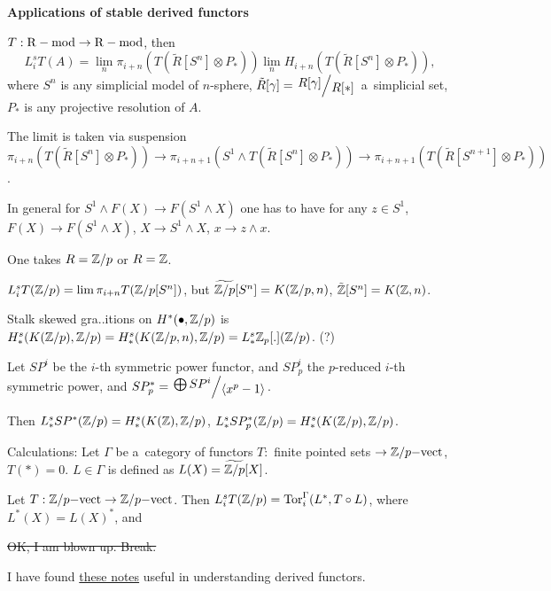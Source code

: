 



    {\bf Applications of stable derived functors}
    
    \begin{theorem}
        $T:\mathrm{R-mod} \to \mathrm{R-mod}$, then 
        $$L_i^sT(A) = \lim_n \pi_{i+n}(T(\tilde{R}[S^n] \otimes P_\ast))
        \lim_n H_{i+n}(T(\tilde{R}[S^n] \otimes P_\ast)),$$
        where $S^n$ is any simplicial model of $n$-sphere,
        $\tilde{R}[\gamma] = \bigslant{R[\gamma]}{R[\ast]}$ a~simplicial set,
        $P_\ast$ is any projective resolution of $A$.
        
        The limit is taken via suspension
        \\ $\pi_{i+n}(T(\tilde{R}[S^n] \otimes P_\ast)) 
        \to \pi_{i+n+1}(S^1 \wedge T(\tilde{R}[S^n] \otimes P_\ast))
        \to \pi_{i+n+1}(T(\tilde{R}[S^{n+1}] \otimes P_\ast))$.
    \end{theorem}
        
    In general for $S^1 \wedge F(X) \to F(S^1 \wedge X)$
    one has to have for any $z \in S^1$,
    ${F(X) \to F(S^1 \wedge X)}$, $X \to S^1 \wedge X$, $x \to z \wedge x$.
    
    One takes $R = {\mathbb{Z}} / p$ or $R = {\mathbb{Z}}$.
    
    $L_i^sT({\mathbb{Z}}/p) = \lim \pi_{i+n} T({\mathbb{Z}}/p [S^n])$,
    but $\widetilde{{\mathbb{Z}}/p}[S^n] = K({\mathbb{Z}}/p,n)$,
    $\tilde{{\mathbb{Z}}}[S^n] = K({\mathbb{Z}}, n)$.
    
    Stalk skewed gra..itions on $H^\ast(\bullet, {\mathbb{Z}}/p)$
    is \\$H_\ast^s(K({\mathbb{Z}}/p),{\mathbb{Z}}/p) 
    = H_\ast^s(K({\mathbb{Z}}/p,n),{\mathbb{Z}}/p)
    = L_\ast^s {\mathbb{Z}}_p[.]({\mathbb{Z}}/p)$. (?)
    
    \begin{theorem}
        Let $SP^i$ be the $i$-th symmetric power functor,
        and $SP^i_p$ the $p$-reduced $i$-th symmetric power,
        and $SP^\ast_p = \bigslant{\bigoplus SP^i}{\langle x^p - 1 \rangle}$.
        
        Then $L_\ast^s SP^\ast({\mathbb{Z}}/p) = H_\ast^s(K({\mathbb{Z}}),{\mathbb{Z}}/p)$,
        $L_\ast^s SP_p^\ast({\mathbb{Z}}/p) = H_\ast^s(K({\mathbb{Z}}/p),{\mathbb{Z}}/p)$.
    \end{theorem}
    
    Calculations: Let $\Gamma$ be a~category of functors 
    $T:$ finite pointed sets $\to {\mathbb{Z}}/p{\mathrm{-vect}}$,
    \\$T(\ast)=0$. 
    $L \in \Gamma$ is defined as $L(X) = \widetilde{{\mathbb{Z}}/p}[X]$.
    
    \begin{lemma}
        Let $T:{\mathbb{Z}}/p{\mathrm{-vect}} \to {\mathbb{Z}}/p{\mathrm{-vect}}$.
        Then $L_i^sT({\mathbb{Z}}/p) = \operatorname{Tor}_i^\Gamma(L^\ast,T\circ L)$,
        where $L^\ast(X) = L(X)^\ast$, and
    \end{lemma}
    
    \sout{OK, I am blown up. Break.}
    
    I have found 
    \href{http://www-irma.u-strasbg.fr/~vespa/Cesaro.pdf}{these notes}
    useful in understanding derived functors.




 
 